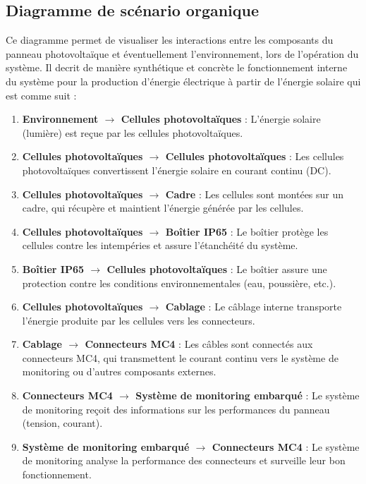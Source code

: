 \documentclass{article}
\begin{document}
\subsection{Diagramme de scénario organique}
Ce diagramme permet de visualiser les interactions entre les composants du panneau photovoltaïque et éventuellement l'environnement, lors de l'opération du système. Il decrit de manière synthétique et concrète le fonctionnement interne du système pour la production d'énergie électrique à partir de l'énergie solaire qui est comme suit : 
\begin{enumerate}[label=\arabic*.]
    \item \textbf{Environnement $\rightarrow$ Cellules photovoltaïques} :  
    L'énergie solaire (lumière) est reçue par les cellules photovoltaïques.
    
    \item \textbf{Cellules photovoltaïques $\rightarrow$ Cellules photovoltaïques} :  
    Les cellules photovoltaïques convertissent l'énergie solaire en courant continu (DC).
    
    \item \textbf{Cellules photovoltaïques $\rightarrow$ Cadre} :  
    Les cellules sont montées sur un cadre, qui récupère et maintient l'énergie générée par les cellules.
    
    \item \textbf{Cellules photovoltaïques $\rightarrow$ Boîtier IP65} :  
    Le boîtier protège les cellules contre les intempéries et assure l'étanchéité du système.
    
    \item \textbf{Boîtier IP65 $\rightarrow$ Cellules photovoltaïques} :  
    Le boîtier assure une protection contre les conditions environnementales (eau, poussière, etc.).
    
    \item \textbf{Cellules photovoltaïques $\rightarrow$ Cablage} :  
    Le câblage interne transporte l'énergie produite par les cellules vers les connecteurs.
    
    \item \textbf{Cablage $\rightarrow$ Connecteurs MC4} :  
    Les câbles sont connectés aux connecteurs MC4, qui transmettent le courant continu vers le système de monitoring ou d'autres composants externes.
    
    \item \textbf{Connecteurs MC4 $\rightarrow$ Système de monitoring embarqué} :  
    Le système de monitoring reçoit des informations sur les performances du panneau (tension, courant).
    
    \item \textbf{Système de monitoring embarqué $\rightarrow$ Connecteurs MC4} :  
    Le système de monitoring analyse la performance des connecteurs et surveille leur bon fonctionnement.
\end{enumerate}
\end{document}
